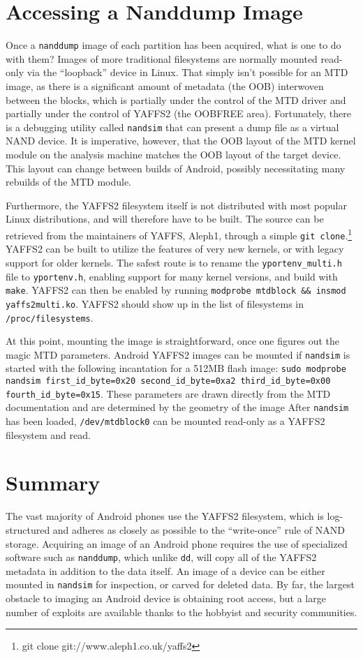 \section{Accessing a Nanddump Image}

Once a \texttt{nanddump} image of each partition has been acquired, what is one to do with them?  Images of more traditional
filesystems are normally mounted read-only via the ``loopback'' device in Linux.  That simply isn't possible for an MTD image, as
there is a significant amount of metadata (the OOB) interwoven between the blocks, which is partially under the control of the MTD
driver and partially under the control of YAFFS2 (the OOBFREE area).  Fortunately, there is a debugging utility called
\texttt{nandsim} that can present a dump file as a virtual NAND device. It is imperative, however, that the OOB layout of the MTD
kernel module on the analysis machine matches the OOB layout of the target device.  This layout can change between builds of Android,
possibly necessitating many rebuilds of the MTD module. 

Furthermore, the YAFFS2 filesystem itself is not distributed with most popular Linux distributions, and will therefore have to be built.
The source can be retrieved from the maintainers of YAFFS, Aleph1, through a simple \texttt{git clone}.\footnote{git clone git://www.aleph1.co.uk/yaffs2} YAFFS2 can be built to utilize the features of very new kernels, or with legacy support for older kernels. 
The safest route is to rename the \texttt{yportenv\_multi.h} file to \texttt{yportenv.h}, enabling support for many kernel versions, and build with \texttt{make}. 
YAFFS2 can then be enabled by running \texttt{modprobe mtdblock \&\& insmod yaffs2multi.ko}. 
YAFFS2 should show up in the list of filesystems in \texttt{/proc/filesystems}.

At this point, mounting the image is straightforward, once one figures out the magic MTD parameters.
Android YAFFS2 images can be mounted if \texttt{nandsim} is started with the following incantation for a 512MB flash image:
\texttt{sudo modprobe nandsim first\_id\_byte=0x20 second\_id\_byte=0xa2 third\_id\_byte=0x00 fourth\_id\_byte=0x15}.
These parameters are drawn directly from the MTD documentation and are determined by the geometry of the image \cite{mtdfaq}
After \texttt{nandsim} has been loaded, \texttt{/dev/mtdblock0} can be mounted read-only as a YAFFS2 filesystem and read.

\section{Summary}

The vast majority of Android phones use the YAFFS2 filesystem, which is log-structured and adheres as closely as possible to the
``write-once'' rule of NAND storage. Acquiring an image of an Android phone requires the use of specialized software such as
\texttt{nanddump}, which unlike \texttt{dd}, will copy all of the YAFFS2 metadata in addition to the data itself. An image of a
device can be either mounted in \texttt{nandsim} for inspection, or carved for deleted data. By far, the largest obstacle to imaging
an Android device is obtaining root access, but a large number of exploits are available thanks to the hobbyist and security
communities.
